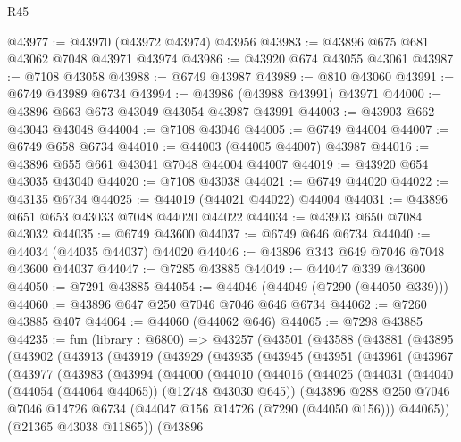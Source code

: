 \begin{lexlean}{R45}
\begin{coremodule}
{@43977 := @43970 (@43972 @43974) @43956
@43983 := @43896 @675 @681 @43062 @7048 @43971 @43974
@43986 := @43920 @674 @43055 @43061
@43987 := @7108 @43058
@43988 := @6749 @43987
@43989 := @810 @43060
@43991 := @6749 @43989 @6734
@43994 := @43986 (@43988 @43991) @43971
@44000 := @43896 @663 @673 @43049 @43054 @43987 @43991
@44003 := @43903 @662 @43043 @43048
@44004 := @7108 @43046
@44005 := @6749 @44004
@44007 := @6749 @658 @6734
@44010 := @44003 (@44005 @44007) @43987
@44016 := @43896 @655 @661 @43041 @7048 @44004 @44007
@44019 := @43920 @654 @43035 @43040
@44020 := @7108 @43038
@44021 := @6749 @44020
@44022 := @43135 @6734
@44025 := @44019 (@44021 @44022) @44004
@44031 := @43896 @651 @653 @43033 @7048 @44020 @44022
@44034 := @43903 @650 @7084 @43032
@44035 := @6749 @43600
@44037 := @6749 @646 @6734
@44040 := @44034 (@44035 @44037) @44020
@44046 := @43896 @343 @649 @7046 @7048 @43600 @44037
@44047 := @7285 @43885
@44049 := @44047 @339 @43600
@44050 := @7291 @43885
@44054 := @44046 (@44049 (@7290 (@44050 @339)))
@44060 := @43896 @647 @250 @7046 @7046 @646 @6734
@44062 := @7260 @43885 @407
@44064 := @44060 (@44062 @646)
@44065 := @7298 @43885
@44235 := fun (library : @6800) =>
  @43257
    (@43501
      (@43588
        (@43881
          (@43895
            (@43902
              (@43913
                (@43919
                  (@43929
                    (@43935
                      (@43945
                        (@43951
                          (@43961
                            (@43967
                              (@43977
                                (@43983
                                  (@43994
                                    (@44000
                                      (@44010
                                        (@44016
                                          (@44025
                                            (@44031
                                              (@44040 (@44054 (@44064 @44065)) (@12748 @43030 @645))
                                              (@43896
                                                @288
                                                @250
                                                @7046
                                                @7046
                                                @14726
                                                @6734
                                                (@44047 @156 @14726 (@7290 (@44050 @156)))
                                                @44065))
                                            (@21365 @43038 @11865))
                                          (@43896
}
\end{coremodule}
\end{lexlean}

